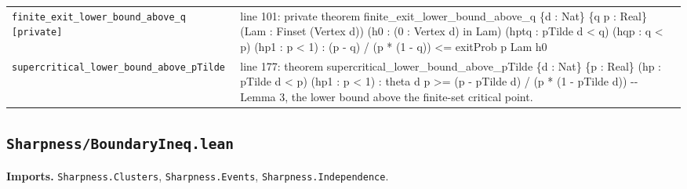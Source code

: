 \documentclass[10pt]{article}
\newcommand{\module}[1]{\texttt{#1}}
\begin{document}
\begin{longtable}{>{\raggedright\arraybackslash}p{} >{\raggedright\arraybackslash}p{}}
\texttt{finite\_\allowbreak{}exit\_\allowbreak{}lower\_\allowbreak{}bound\_\allowbreak{}above\_\allowbreak{}q [private]} & {\ttfamily\scriptsize line 101:\allowbreak{} private theorem finite\_\allowbreak{}exit\_\allowbreak{}lower\_\allowbreak{}bound\_\allowbreak{}above\_\allowbreak{}q \{d :\allowbreak{} Nat\} \{q p :\allowbreak{} Real\} (\allowbreak{}Lam :\allowbreak{} Finset (\allowbreak{}Vertex d)\allowbreak{})\allowbreak{} (\allowbreak{}h0 :\allowbreak{} (\allowbreak{}0 :\allowbreak{} Vertex d)\allowbreak{} in Lam)\allowbreak{} (\allowbreak{}hptq :\allowbreak{} pTilde d < q)\allowbreak{} (\allowbreak{}hqp :\allowbreak{} q < p)\allowbreak{} (\allowbreak{}hp1 :\allowbreak{} p < 1)\allowbreak{} :\allowbreak{} (\allowbreak{}p -\allowbreak{} q)\allowbreak{} /\allowbreak{} (\allowbreak{}p *\allowbreak{} (\allowbreak{}1 -\allowbreak{} q)\allowbreak{})\allowbreak{} <=\allowbreak{} exitProb p Lam h0} \\[0.45em]
\texttt{supercritical\_\allowbreak{}lower\_\allowbreak{}bound\_\allowbreak{}above\_\allowbreak{}pTilde} & {\ttfamily\scriptsize line 177:\allowbreak{} theorem supercritical\_\allowbreak{}lower\_\allowbreak{}bound\_\allowbreak{}above\_\allowbreak{}pTilde \{d :\allowbreak{} Nat\} \{p :\allowbreak{} Real\} (\allowbreak{}hp :\allowbreak{} pTilde d < p)\allowbreak{} (\allowbreak{}hp1 :\allowbreak{} p < 1)\allowbreak{} :\allowbreak{} theta d p >=\allowbreak{} (\allowbreak{}p -\allowbreak{} pTilde d)\allowbreak{} /\allowbreak{} (\allowbreak{}p *\allowbreak{} (\allowbreak{}1 -\allowbreak{} pTilde d)\allowbreak{})\allowbreak{} -\allowbreak{}-\allowbreak{} Lemma 3,\allowbreak{} the lower bound above the finite-\allowbreak{}set critical point.\allowbreak{}} \\[0.45em]
\end{longtable}

\subsection*{\module{Sharpness/BoundaryIneq.lean}}
\textbf{Imports.} \module{Sharpness.Clusters}, \module{Sharpness.Events}, \module{Sharpness.Independence}.
\end{document}
